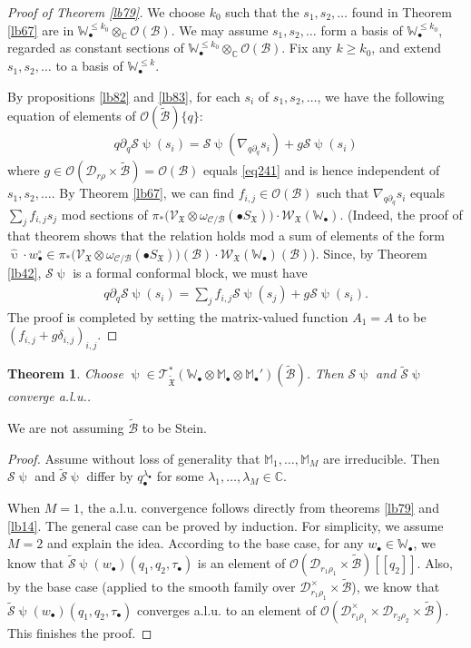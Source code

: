 \documentclass[12pt,b5paper,notitlepage]{report}
\theoremstyle{definition}
\theoremstyle{plain}
\newtheorem{thm}[df]{Theorem}
\newcommand{\fk}{\mathfrak}
\newcommand{\mc}{\mathcal}
\newcommand{\wtd}{\widetilde}
\newcommand{\wht}{\widehat}
\newcommand{\scr}{\mathscr}
\newcommand{\blt}{\bullet}
\newcommand{\Wbb}{\mathbb W}
\newcommand{\Mbb}{\mathbb M}
\newcommand{\Cbb}{\mathbb C}
\numberwithin{equation}{section}
\begin{document}
\begin{proof}[Proof of Theorem \ref{lb79}]
We choose $k_0$ such that the $s_1,s_2,\dots$ found in Theorem \ref{lb67} are in $\Wbb_\blt^{\leq k_0}\otimes_\Cbb\scr O(\mc B)$. We may assume $s_1,s_2,\dots$ form a basis of $\Wbb_\blt^{\leq k_0}$, regarded as constant sections of $\Wbb_\blt^{\leq k_0}\otimes_\Cbb\scr O(\mc B)$. Fix any $k\geq k_0$, and extend $s_1,s_2,\dots$ to a basis of $\Wbb_\blt^{\leq k}$.

By propositions \ref{lb82} and \ref{lb83},  for each $s_i$ of $s_1,s_2,\dots$,  we have the following equation of elements of $\scr O(\wtd{\mc B})\{q\}$:
\begin{align*}
q\partial_q\mc S\uppsi(s_i)=\mc S\uppsi(\nabla_{q\partial_q}s_i)+g\mc S\uppsi(s_i)
\end{align*}
where $g\in\scr O(\mc D_{r\rho}\times\wtd{\mc B})=\scr O(\mc B)$ equals \eqref{eq241} and is hence independent of $s_1,s_2,\dots$. By Theorem \ref{lb67}, we can find $f_{i,j}\in\scr O(\mc B)$ such that $\nabla_{q\partial_q}s_i$ equals $\sum_j f_{i,j}s_j$ mod  sections of $\pi_*\big(\scr V_{\fk X}\otimes\omega_{\mc C/\mc B}(\blt S_{\fk X})\big)\cdot \scr W_{\fk X}(\Wbb_\blt)$. (Indeed, the proof of that theorem shows that the relation holds mod a sum of elements of the form $\wht\upupsilon\cdot w_\blt^\circ\in\pi_*\big(\scr V_{\fk X}\otimes\omega_{\mc C/\mc B}(\blt S_{\fk X})\big)(\mc B)\cdot \scr W_{\fk X}(\Wbb_\blt)(\mc B)$). Since, by Theorem \ref{lb42}, $\mc S\uppsi$ is a formal conformal block, we must have
\begin{align*}
q\partial_q\mc S\uppsi(s_i)=\sum_j f_{i,j}\mc S\uppsi(s_j)+g\mc S\uppsi(s_i).
\end{align*}
The proof is  completed by setting the matrix-valued function $A_1=A$ to be $(f_{i,j}+g\delta_{i,j})_{i,j}$.
\end{proof}


\begin{thm}
Choose $\uppsi\in\scr T_{\wtd{\fk X}}^*(\Wbb_\blt\otimes\Mbb_\blt\otimes\Mbb_\blt')(\wtd{\mc B})$. Then $\mc S\uppsi$ and $\wtd{\mc S}\uppsi$ converge a.l.u..
\end{thm}

We are not assuming $\wtd{\mc B}$ to be Stein.
\begin{proof}
Assume without loss of generality that $\Mbb_1,\dots,\Mbb_M$ are irreducible. Then $\mc S\uppsi$ and $\wtd{\mc S}\uppsi$ differ by $q_\blt^{\lambda_\blt}$ for some $\lambda_1,\dots,\lambda_M\in\Cbb$.

When $M=1$, the a.l.u. convergence follows directly from theorems \ref{lb79} and \ref{lb14}. The general case can be proved by induction. For simplicity, we assume $M=2$ and explain the idea. According to the base case, for any $w_\blt\in\Wbb_\blt$, we know that $\wtd{\mc S}\uppsi(w_\blt)(q_1,q_2,\tau_\blt)$ is an element of $\scr O(\mc D_{r_1\rho_1}\times\wtd{\mc B})[[q_2]]$. Also, by the base case (applied to the smooth family over $\mc D_{r_1\rho_1}^\times\times\wtd{\mc B}$), we know that $\wtd{\mc S}\uppsi(w_\blt)(q_1,q_2,\tau_\blt)$ converges a.l.u. to an element of $\scr O(\mc D_{r_1\rho_1}^\times\times\mc D_{r_2\rho_2}\times\wtd{\mc B})$. This finishes the proof.
\end{proof}
\end{document}
